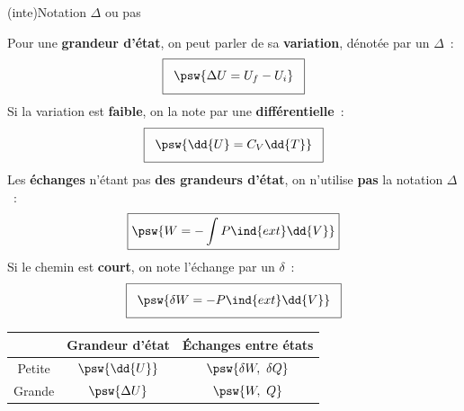 \documentclass[../../main/main.tex]{subfiles}
\begin{document}
\begin{tcbraster}[raster equal height=rows, raster columns=2]
\begin{tcb*}[%
			sidebyside, righthand ratio=.5,
			list entry={\hspace*{-20pt}\protect\rcheck~~Premier principe élémentaire}%
		]
\begin{center}
{			}
		\end{center}
	\end{tcb*}
\end{tcbraster}

\begin{tcb*}(inte){Notation $\Delta$ ou pas}
	\begin{isd}[sidebyside align=top]
		Pour une \textbf{grandeur d'état}, on peut parler de sa
		\textbf{variation}, dénotée par un $\Delta$~:
		\[
			\setlength{\fboxsep}{3mm}
			\boxed{\psw{\Delta{U} = U_f - U_i}}
		\]
		Si la variation est \textbf{faible}, on la note par une
		\textbf{différentielle}~:
		\[
			\setlength{\fboxsep}{3mm}
			\boxed{\psw{\dd{U} = C_V \dd{T}}}
		\]
		\tcblower
		Les \textbf{échanges} n'étant pas \textbf{des grandeurs d'état}, on n'utilise \textbf{pas} la
		notation
		$\Delta$~:
		\[
			\boxed{\psw{W = -\int P\ind{ext}\dd{V}}}
		\]
		Si le chemin est \textbf{court}, on note l'échange par un $\delta$~:
		\[
			\setlength{\fboxsep}{3mm}
			\boxed{\psw{\delta W = -P\ind{ext}\dd{V}}}
		\]
	\end{isd}
	\begin{center}
		\begin{tabular}{ccc}
			\toprule
			\backslashbox{Différence}{Grandeur}
			 &
			\textbf{Grandeur d'état}
			 &
			\textbf{Échanges entre états}
			\\
			\midrule
			Petite
			 &
			$\psw{\dd{U}}$
			 &
			$\psw{\delta W,~\delta Q}$
			\\
			Grande
			 &
			$\psw{\Delta{U}}$
			 &
			$\psw{W,~Q}$
			\\
			\bottomrule
		\end{tabular}
	\end{center}
\end{tcb*}
\end{document}
